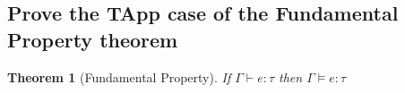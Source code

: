 \documentclass[a4paper,10pt,fleqn]{article}
\newcommand{\sem}[1]{\ensuremath{\llbracket #1 \rrbracket}}
\newcommand{\curly}[1]{\ensuremath{\mathcal{#1}}}
\DeclareMathOperator{\irred}{irred}
\newcommand{\evalto}{\ensuremath{\mapsto}}
\newcommand{\evaltos}[1][*]{\ensuremath{\evalto^{#1}}}
\newcommand{\pred}[2]{\ensuremath{\curly{#1}\sem{#2}}}
\newcommand{\epred}[1]{\ensuremath{\pred{E}{#1}}}
\newcommand{\vpred}[1]{\ensuremath{\pred{V}{#1}}}
\newtheorem*{theorem}{Theorem}
\newtheorem*{lemma}{Lemma}
\begin{document}
\subsection*{Prove the TApp case of the Fundamental Property theorem}

\begin{comment}
  \begin{lemma}[Preservation of $\curly{E}$ over backward reduction]
    If $e \evalto e'$ and $e' \in \epred{\tau}$ then $e \in \epred{\tau}$.
  \end{lemma}
  \begin{proof}
    Suppose we have $e\evaltos e''$ and $\irred{e''}$ for some $e''$. We then need to show
    \[
    e'' \in vpred{\tau}
    \]
    As our language is deterministic and we know that $e$ steps to $e'$ then $e'$ must step to $e''$ in a number of steps. We can then instantiate $e' \in \epred{\tau}$ with $e' \evaltos e''$ and $\irred{e''}$ to get $e'' \in \vpred{\tau} $ which is the result we desired.
  \end{proof}
\end{comment}
\begin{theorem}[Fundamental Property]
  If $\Gamma \vdash e : \tau$ then $\Gamma \models e : \tau$
\end{theorem}
\end{document}
